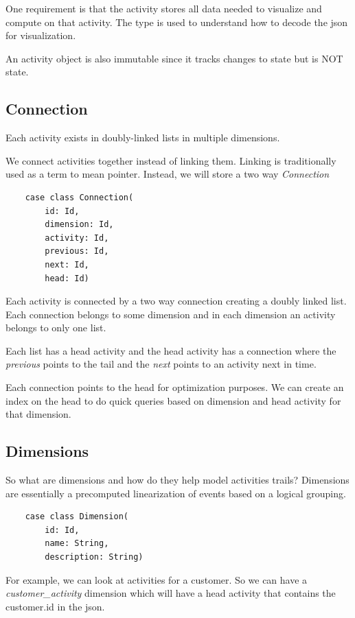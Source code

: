 \documentclass[11pt]{article}
\begin{document}
One requirement is that the activity stores all data needed to visualize and compute on that activity. The type is used to understand how to decode the json for visualization.

An activity object is also immutable since it tracks changes to state but is NOT state.

\subsection{Connection}

Each activity exists in doubly-linked lists in multiple dimensions.

We connect activities together instead of linking them. Linking is traditionally used
as a term to mean pointer. Instead, we will store a two way \emph{Connection}

\begin{lstlisting}
    case class Connection(
        id: Id, 
        dimension: Id, 
        activity: Id, 
        previous: Id, 
        next: Id, 
        head: Id)
\end{lstlisting}

Each activity is connected by a two way connection creating a doubly linked list. Each
connection belongs to some dimension and in each dimension an activity belongs to only
one list. 

Each list has a head activity and the head activity has a connection where
the \emph{previous} points to the tail and the \emph{next} points to an activity next in time.

Each connection points to the head for optimization purposes. We can create an
index on the head to do quick queries based on dimension and head activity for that dimension.

\subsection{Dimensions}

So what are dimensions and how do they help model activities trails? Dimensions are essentially
a precomputed linearization of events based on a logical grouping.

\begin{lstlisting}
    case class Dimension(
        id: Id, 
        name: String, 
        description: String)
\end{lstlisting}

For example, we can look at activities for a customer. So we can have a \emph{customer\_activity}
dimension which will have a head activity that contains the customer.id in the json.
\end{document}
